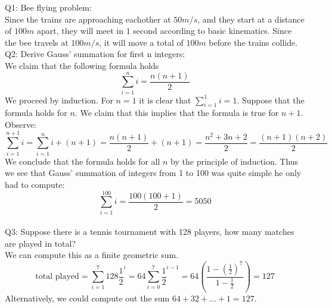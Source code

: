 \documentclass[letterpaper]{article}
\begin{document}
\noindent
Q1: Bee flying problem: \\
Since the trains are approaching eachother at $50m/s$, and they start at a distance of $100m$ apart, they will meet in $1$ second according to basic kinematics. Since the bee travels at $100m/s$, it will move a total of $100m$ before the trains collide. 
\newline \\ 
Q2: Derive Gauss' summation for first n integers: \\ We claim that the following formula holds $$\sum_{i=1}^n i = \frac{n(n+1)}{2}$$ We proceed by induction. For $n=1$ it is clear that $\sum_{i=1}^1 i =1$. Suppose that the formula holds for $n$. We claim that this implies that the formula is true for $n+1$. Observe: 
$$\sum_{i=1}^{n+1} i = \sum_{i=1}^n i +(n+1) = \frac{n(n+1)}{2} + (n+1) = \frac{n^2 +3n+2}{2} = \frac{(n+1)(n+2)}{2}$$
We conclude that the formula holds for all $n$ by the principle of induction. Thus we see that Gauss' summation of integers from 1 to 100 was quite simple he only had to compute: 
$$\sum_{i=1}^{100} i = \frac{100(100+1)}{2} = 5050$$ 
\newline \\ Q3: Suppose there is a tennis tournament with 128 players, how many matches are played in total?
\\ We can compute this as a finite geometric sum. $$\text{total played} = \sum_{i=1}^7 128 \frac{1}{2}^i = 64 \sum_{i=0}^{7} \frac{1}{2}^{i-1} = 64(\frac{1-(\frac{1}{2})^7}{1 - \frac{1}{2}}) = 127$$
Alternatively, we could compute out the sum $64+ 32 + \dots + 1 = 127$. 
\end{document}
